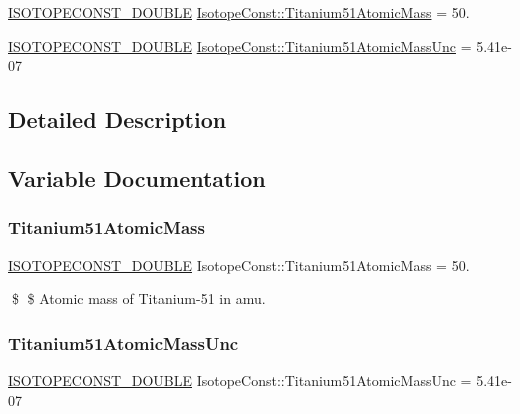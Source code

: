\begin{DoxyCompactItemize}
\item 
\mbox{\hyperlink{group___isotope_const-_macros_ga8f45a7272ce02c0b4c65c44636ed719a}{I\+S\+O\+T\+O\+P\+E\+C\+O\+N\+S\+T\+\_\+\+D\+O\+U\+B\+LE}} \mbox{\hyperlink{group___isotope_const-_titanium-_ti51_ga9cb8650af23ec986f3178b1f2a83f1e1}{Isotope\+Const\+::\+Titanium51\+Atomic\+Mass}} = 50.
\item 
\mbox{\hyperlink{group___isotope_const-_macros_ga8f45a7272ce02c0b4c65c44636ed719a}{I\+S\+O\+T\+O\+P\+E\+C\+O\+N\+S\+T\+\_\+\+D\+O\+U\+B\+LE}} \mbox{\hyperlink{group___isotope_const-_titanium-_ti51_ga11d0a5cc063043edb17a50abf1d4f7f4}{Isotope\+Const\+::\+Titanium51\+Atomic\+Mass\+Unc}} = 5.\+41e-\/07
\end{DoxyCompactItemize}


\subsection{Detailed Description}


\subsection{Variable Documentation}
\mbox{\label{group___isotope_const-_titanium-_ti51_ga9cb8650af23ec986f3178b1f2a83f1e1}} 
\subsubsection{\texorpdfstring{Titanium51\+Atomic\+Mass}{Titanium51AtomicMass}}
{\footnotesize\ttfamily \mbox{\hyperlink{group___isotope_const-_macros_ga8f45a7272ce02c0b4c65c44636ed719a}{I\+S\+O\+T\+O\+P\+E\+C\+O\+N\+S\+T\+\_\+\+D\+O\+U\+B\+LE}} Isotope\+Const\+::\+Titanium51\+Atomic\+Mass = 50.}

\$ \$ Atomic mass of Titanium-\/51 in amu. \mbox{\label{group___isotope_const-_titanium-_ti51_ga11d0a5cc063043edb17a50abf1d4f7f4}} 
\subsubsection{\texorpdfstring{Titanium51\+Atomic\+Mass\+Unc}{Titanium51AtomicMassUnc}}
{\footnotesize\ttfamily \mbox{\hyperlink{group___isotope_const-_macros_ga8f45a7272ce02c0b4c65c44636ed719a}{I\+S\+O\+T\+O\+P\+E\+C\+O\+N\+S\+T\+\_\+\+D\+O\+U\+B\+LE}} Isotope\+Const\+::\+Titanium51\+Atomic\+Mass\+Unc = 5.\+41e-\/07}

